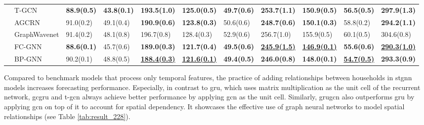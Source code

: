 \begin{table*}[htbp]
{\begin{tabular}{cllllllllll}
& T-GCN                                     & \textbf{88.9(0.5)} & \textbf{43.8(0.1)} & \textbf{193.5(1.0)}   &   \textbf{125.0(0.5)}      &   \textbf{49.7(0.6)}      &     \textbf{253.7(1.1)}    & \textbf{150.9(0.5)} & \textbf{56.5(0.5)} & \textbf{297.9(1.3)}  \\
& AGCRN                                     & 91.0(0.2) & 49.1(0.4) & \textbf{190.9(0.6)} & \textbf{123.8(0.3)} & 50.6(0.6) & \textbf{248.7(0.6)} & \textbf{150.1(0.3)} & 58.8(0.2) & \textbf{294.2(1.1)}       \\
& GraphWavenet   & 91.4(0.2) & 48.1(0.8) & 196.7(0.8) & 128.4(0.3) & 52.9(0.6) & 256.7(1.0) & 155.9(0.5) & 60.1(0.5) & 304.6(0.8)  \\
& FC-GNN                            &   \textbf{88.6(0.1)} & 45.7(0.6) & \textbf{189.0(0.3)} & \textbf{121.7(0.4)} & \textbf{49.5(0.6)} & \underline{\textbf{245.9(1.5)}} & \underline{\textbf{146.9(0.1)}} & \textbf{55.6(0.6)} & \underline{\textbf{290.3(1.0)}}     \\
& BP-GNN                                   &   90.2(0.1) & 48.8(0.5) & \underline{\textbf{188.4(0.3)}} & \underline{\textbf{121.6(0.1)}} & \textbf{49.4(0.5)} & \textbf{246.0(0.8)} & \textbf{148.0(0.1)} & \underline{\textbf{54.7(0.5)}} & \textbf{293.3(0.9) }     \\
\hline
\hline
\end{tabular}
}
\endgroup
\label{tab:result_228}
\end{table*}

Compared to benchmark models that process only temporal features, the practice of adding relationships between households in \acrshort{stgnn} models increases forecasting performance. Especially, in contrast to \acrshort{gru}, which uses matrix multiplication as the unit cell of the recurrent network, \acrshort{gcgru} and \acrshort{t-gcn} always achieve better performance by applying \acrshort{gcn} as the unit cell. Similarly, \acrshort{grugcn} also outperforms \acrshort{gru} by applying \acrshort{gcn} on top of it to account for spatial dependency. It showcases the effective use of graph neural networks to model spatial relationships (see Table \ref{tab:result_228}).


